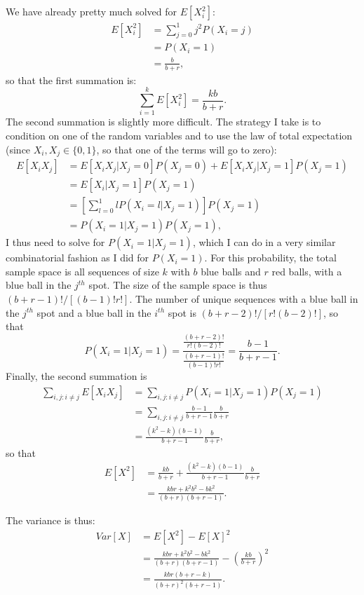 \begin{problem}{5}
\begin{enumerate}
We have already pretty much solved for $E[X_i^2]$:
\begin{align*}
 E[X_i^2]&= \sum_{j=0}^1 j^2 P(X_i = j) \\
 &= P(X_i = 1) \\
 &= \frac{b}{b+r}, 
 \end{align*}
 so that the first summation is:
\begin{equation*}
\sum_{i=1}^kE[X_i^2] = \frac{kb}{b+r}.
\end{equation*}
The second summation is slightly more difficult.  The strategy I take is to condition on one of the random variables and to use the law of total expectation (since $X_i, X_j \in \{ 0, 1\}$, so that one of the terms will go to zero):
\begin{align*}
E[X_iX_j] &= E[X_iX_j|X_j=0]P(X_j=0)+E[X_iX_j|X_j=1]P(X_j=1) \\
&= E[X_i|X_j=1]P(X_j=1) \\
& = \left[\sum_{l=0}^1 l P(X_i =l |X_j=1)\right ]P(X_j=1) \\
& = P(X_i=1|X_j=1)P(X_j=1),
\end{align*}
I thus need to solve for $P(X_i=1|X_j=1)$, which I can do in a very similar combinatorial fashion as I did for $P(X_i=1)$.  For this probability, the total sample space is all sequences of size $k$ with $b$ blue balls and $r$ red balls, with a blue ball in the $j^{th}$ spot.  The size of the sample space is thus $(b+r-1)!/[(b-1)!r!]$.  The number of unique sequences with a blue ball in the $j^{th}$ spot and a blue ball in the $i^{th}$ spot is $(b+r-2)!/[r!(b-2)!]$, so that 
\begin{equation*}
P(X_i=1|X_j=1) = \frac{\frac{(b+r-2)!}{r!(b-2)!}}{\frac{(b+r-1)!}{(b-1)!r!}} = \frac{b-1}{b+r-1}.
\end{equation*}
Finally, the second summation is 
\begin{align*}
\sum_{i, j: i \neq j} E[X_iX_j] &= \sum_{i, j: i \neq j}P(X_i=1|X_j=1)P(X_j=1) \\
& = \sum_{i, j: i \neq j}\frac{b-1}{b+r-1}\frac{b}{b+r} \\
& = \frac{(k^2-k)(b-1)}{b+r-1}\frac{b}{b+r},
\end{align*}
so that
\begin{align*}
 E[X^2] &= \frac{kb}{b+r}+\frac{(k^2-k)(b-1)}{b+r-1}\frac{b}{b+r} \\
 &=\frac{kbr+k^2b^2-bk^2}{(b+r)(b+r-1)}.
\end{align*}

The variance is thus:
\begin{align*}
Var[X] &= E[X^2] -E[X]^2 \\
& = \frac{kbr+k^2b^2-bk^2}{(b+r)(b+r-1)}-\left(\frac{kb}{b+r}\right)^2 \\
& = \frac{kbr(b+r-k)}{(b+r)^2(b+r-1)}.
\end{align*}


\end{enumerate}
\end{problem}


